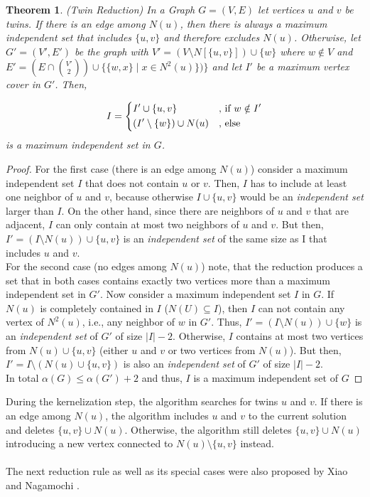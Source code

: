 \documentclass[]{article}
\newtheorem{theorem}{Theorem}
\begin{document}
\begin{theorem} (Twin Reduction) In a Graph $G=(V,E)$ let vertices $u$ and $v$ be twins. If there is an edge among $N(u)$, then there is always a maximum independent set that includes $\{u,v\}$ and therefore excludes $N(u)$. Otherwise, let $G'=(V',E')$ be the graph with $V'=(V\setminus N[\{u,v\}])\cup\{w\}$ where $w\notin V$ and $E'=(E\cap\binom{V'}{2})\cup \{\{w,x\}\;|\;x\in N^2(u)\})\}$ and let $I'$ be a \textit{maximum vertex cover} in $G'$. Then, 
	
	\[I=\begin{dcases}
	I'\cup \{u,v\} & \text{, if }w\notin I'\\
	(I'\setminus \{w\})\cup N(u) & \text{, else} %
	\end{dcases}\]
	is a maximum independent set in $G$.
\end{theorem}
\begin{proof}
	For the first case (there is an edge among $N(u)$) consider a maximum independent set $I$ that does not contain $u$ or $v$. Then, $I$ has to include at least one neighbor of $u$ and $v$, because otherwise $I\cup \{u,v\}$ would be an \textit{independent set} larger than $I$. On the other hand, since there are neighbors of $u$ and $v$ that are adjacent, $I$ can only contain at most two neighbors of $u$ and $v$. But then, $I' = (I\setminus N(u))\cup\{u,v\}$ is an \textit{independent set} of the same size as I that includes $u$ and $v$.\\
	For the second case (no edges among $N(u)$) note, that the reduction produces a set that in both cases contains exactly two vertices more than a maximum independent set in $G'$. Now consider a maximum independent set $I$ in $G$. If $N(u)$ is completely contained in $I$ ($N(U)\subseteq I$), then $I$ can not contain any vertex of $N^2(u)$, i.e., any neighbor of $w$ in $G'$. Thus, $I' = (I\setminus N(u))\cup\{w\}$ is an \textit{independent set} of $G'$ of size $|I| - 2$. Otherwise, $I$ contains at most two vertices from $N(u)\cup\{u,v\}$ (either $u$ and $v$ or two vertices from $N(u)$). But then, $I' = I\setminus(N(u)\cup\{u,v\})$ is also an \textit{independent set} of $G'$ of size $|I|-2$.\\
	In total $\alpha(G) \leq \alpha(G')+2$ and thus, $I$ is a maximum independent set of $G$
	\end{proof}

During the kernelization step, the algorithm searches for twins $u$ and $v$. If there is an edge among $N(u)$, the algorithm includes $u$ and $v$ to the current solution and deletes $\{u,v\}\cup N(u)$. Otherwise, the algorithm still deletes $\{u,v\}\cup N(u)$ introducing a new vertex connected to $N(u)\setminus\{u,v\}$ instead.\paragraph{}
The next reduction rule as well as its special cases were also proposed by Xiao and Nagamochi \cite{XiaoUnconfined}.
\end{document}
